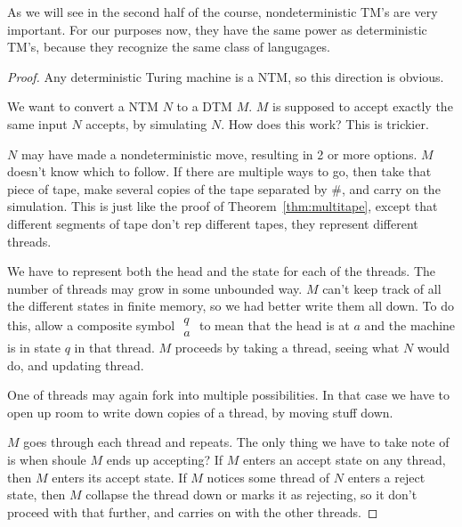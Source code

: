 As we will see in the second half of the course, nondeterministic TM's are very important. For our purposes now, they have the same power as deterministic TM's, because they recognize the same class of langugages.
\begin{proof}
Any deterministic Turing machine is a NTM, so this direction is  obvious.

We want to convert a NTM $N$ to a DTM $M$. $M$ is supposed to accept exactly the same input $N$ accepts, by simulating $N$. How does this work? This is trickier. 

$N$ may have made a nondeterministic move, resulting in  2 or more options. $M$ doesn't know which to follow. If there are multiple ways to go, then take that piece of tape, make several copies of the tape separated by $\#$, and carry on the simulation. %
This is just like the proof of Theorem~\ref{thm:multitape}, except that different segments of tape don't rep different tapes, they represent different threads.

We have to represent both the head and the state for each of the threads. The number of threads may grow in some unbounded way. $M$ can't keep track of all the different states in finite memory, so we had better write them all down. 
To do this, allow a composite symbol $\begin{matrix}q\\a\end{matrix}$ to mean that the head is at $a$ and the machine is in state $q$ in that thread.  
$M$ proceeds by taking a thread, seeing what $N$ would do, and updating thread. 

One of threads may again fork into multiple possibilities. In that case we have to open up room to write down copies of a thread, by moving stuff down. %

$M$ goes through each thread and repeats. The only thing we have to take note of is when shoule $M$ ends up accepting? If $M$ enters an accept state on any thread, then $M$ enters its accept state. If $M$ notices some thread of $N$ enters a reject state, then $M$ collapse the thread down or marks it as rejecting, so it don't proceed with that further, and carries on with the other threads.
\end{proof}


